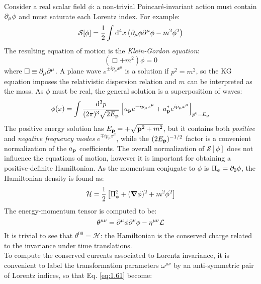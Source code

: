 Consider a real scalar field $ \phi $: a non-trivial Poincaré-invariant action must contain $ \partial_\mu \phi $ and must saturate each Lorentz index. For example:
\begin{equation}
  \mathcal{S}[\phi] = \frac{1}{2} \int \mathrm{d}^4 x \left( \partial_\mu \phi \partial^\mu \phi - m^2 \phi^2 \right)
  \label{eq:1.68}
\end{equation}
The resulting equation of motion is the \textit{Klein-Gordon equation}:
\begin{equation}
  \left( \Box + m^2 \right) \phi = 0
  \label{eq:1.69}
\end{equation}
where $ \Box \equiv \partial_\mu \partial^\mu $. A plane wave $ e^{\pm i p_\mu x^\mu} $ is a solution if $ p^2 = m^2 $, so the KG equation imposes the relativistic dispersion relation and $ m $ can be interpreted as the mass. As $ \phi $ must be real, the general solution is a superposition of waves:
\begin{equation}
  \phi(x) = \int \frac{\mathrm{d}^3 p}{(2\pi)^3 \sqrt{2E_{\mathbf{p}}}} \left[ a_{\mathbf{p}} e^{-i p_\mu x^\mu} + a^*_{\mathbf{p}} e^{i p_\mu x^\mu} \right]_{p^0 = E_{\mathbf{p}}}
  \label{eq:1.70}
\end{equation}
The positive energy solution has $ E_{\mathbf{p}} = + \sqrt{\mathbf{p}^2 + m^2} $, but it contains both \textit{positive} and \textit{negative frequency modes} $ e^{\mp i p_\mu x^\mu} $, while the $ (2E_{\mathbf{p}})^{-1/2} $ factor is a convenient normalization of the $ a_{\mathbf{p}} $ coefficients. The overall normalization of $ \mathcal{S}[\phi] $ does not influence the equations of motion, however it is important for obtaining a positive-definite Hamiltonian. As the momentum conjugate to $ \phi $ is $ \Pi_\phi = \partial_0 \phi $, the Hamiltonian density is found as:
\begin{equation}
  \mathcal{H} = \frac{1}{2} \left[ \Pi_\phi^2 + (\boldsymbol{\nabla} \phi)^2 + m^2 \phi^2 \right]
  \label{eq:1.71}
\end{equation}
The energy-momentum tensor is computed to be:
\begin{equation}
  \theta^{\mu \nu} = \partial^\mu \phi \partial^\nu \phi - \eta^{\mu \nu} \mathcal{L}
  \label{eq:1.72}
\end{equation}
It is trivial to see that $ \theta^{00} = \mathcal{H} $: the Hamiltonian is the conserved charge related to the invariance under time translations.\\
To compute the conserved currents associated to Lorentz invariance, it is convenient to label the transformation parameters $ \omega^{\mu \nu} $ by an anti-symmetric pair of Lorentz indices, so that Eq. \ref{eq:1.61} become:

